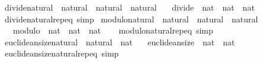 \begin{isabellebody}
\ divide{\isacharunderscore}{\kern0pt}natural\ {\isacharcolon}{\kern0pt}{\isacharcolon}{\kern0pt}\ {\isachardoublequoteopen}natural\ {\isasymRightarrow}\ natural\ {\isasymRightarrow}\ natural{\isachardoublequoteclose}\isanewline
\ \ \ {\isachardoublequoteopen}divide\ {\isacharcolon}{\kern0pt}{\isacharcolon}{\kern0pt}\ nat\ {\isasymRightarrow}\ nat\ {\isasymRightarrow}\ nat{\isachardoublequoteclose}\isanewline
%
\isadelimproof
\ \ %
\endisadelimproof
%
\isatagproof
\isacommand{{\isachardot}{\kern0pt}}\isamarkupfalse%
%
\endisatagproof
{\isafoldproof}%
%
\isadelimproof
\isanewline
%
\endisadelimproof
\isanewline
{}\isamarkupfalse%
\ divide{\isacharunderscore}{\kern0pt}natural{\isachardot}{\kern0pt}rep{\isacharunderscore}{\kern0pt}eq\ {\isacharbrackleft}{\kern0pt}simp{\isacharbrackright}{\kern0pt}\isanewline
\isanewline
{}\isamarkupfalse%
\ modulo{\isacharunderscore}{\kern0pt}natural\ {\isacharcolon}{\kern0pt}{\isacharcolon}{\kern0pt}\ {\isachardoublequoteopen}natural\ {\isasymRightarrow}\ natural\ {\isasymRightarrow}\ natural{\isachardoublequoteclose}\isanewline
\ \ \ {\isachardoublequoteopen}modulo\ {\isacharcolon}{\kern0pt}{\isacharcolon}{\kern0pt}\ nat\ {\isasymRightarrow}\ nat\ {\isasymRightarrow}\ nat{\isachardoublequoteclose}\isanewline
%
\isadelimproof
\ \ %
\endisadelimproof
%
\isatagproof
\isacommand{{\isachardot}{\kern0pt}}\isamarkupfalse%
%
\endisatagproof
{\isafoldproof}%
%
\isadelimproof
\isanewline
%
\endisadelimproof
\isanewline
{}\isamarkupfalse%
\ modulo{\isacharunderscore}{\kern0pt}natural{\isachardot}{\kern0pt}rep{\isacharunderscore}{\kern0pt}eq\ {\isacharbrackleft}{\kern0pt}simp{\isacharbrackright}{\kern0pt}\isanewline
\isanewline
{}\isamarkupfalse%
\ euclidean{\isacharunderscore}{\kern0pt}size{\isacharunderscore}{\kern0pt}natural\ {\isacharcolon}{\kern0pt}{\isacharcolon}{\kern0pt}\ {\isachardoublequoteopen}natural\ {\isasymRightarrow}\ nat{\isachardoublequoteclose}\isanewline
\ \ \ {\isachardoublequoteopen}euclidean{\isacharunderscore}{\kern0pt}size\ {\isacharcolon}{\kern0pt}{\isacharcolon}{\kern0pt}\ nat\ {\isasymRightarrow}\ nat{\isachardoublequoteclose}\isanewline
%
\isadelimproof
\ \ %
\endisadelimproof
%
\isatagproof
\isacommand{{\isachardot}{\kern0pt}}\isamarkupfalse%
%
\endisatagproof
{\isafoldproof}%
%
\isadelimproof
\isanewline
%
\endisadelimproof
\isanewline
{}\isamarkupfalse%
\ euclidean{\isacharunderscore}{\kern0pt}size{\isacharunderscore}{\kern0pt}natural{\isachardot}{\kern0pt}rep{\isacharunderscore}{\kern0pt}eq\ {\isacharbrackleft}{\kern0pt}simp{\isacharbrackright}{\kern0pt}\isanewline

\end{isabellebody}
